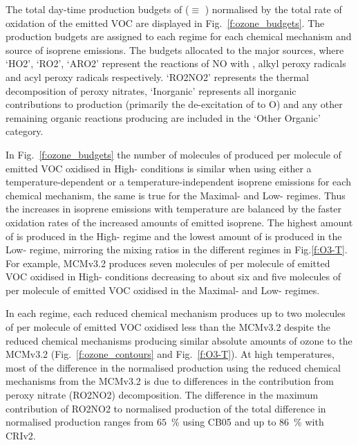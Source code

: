 The total day-time production budgets of  ($\equiv$ ) normalised by the total rate of oxidation of the emitted VOC are displayed in Fig.~\ref{f:ozone_budgets}.
The  production budgets are assigned to each  regime for each chemical mechanism and source of isoprene emissions.
The budgets allocated to the major sources, where `HO2', `RO2', `ARO2' represent the reactions of NO with , alkyl peroxy radicals and acyl peroxy radicals respectively.
`RO2NO2' represents the thermal decomposition of peroxy nitrates, `Inorganic' represents all inorganic contributions to  production (primarily the de-excitation of  to O) and any other remaining organic reactions producing  are included in the `Other Organic' category.

In Fig.~\ref{f:ozone_budgets} the number of molecules of  produced per molecule of emitted VOC oxidised in High- conditions is similar when using either a temperature-dependent or a temperature-independent isoprene emissions for each chemical mechanism, the same is true for the Maximal- and Low- regimes.
Thus the increases in isoprene emissions with temperature are balanced by the faster oxidation rates of the increased amounts of emitted isoprene.
The highest amount of  is produced in the High- regime and the lowest amount of  is produced in the Low- regime, mirroring the  mixing ratios in the different  regimes in Fig.\ref{f:O3-T}.
For example, MCMv3.2 produces seven molecules of  per molecule of emitted VOC oxidised in High- conditions decreasing to about six and five molecules of  per molecule of emitted VOC oxidised in the Maximal- and Low- regimes.

In each  regime, each reduced chemical mechanism produces up to two molecules of  per molecule of emitted VOC oxidised less than the MCMv3.2 despite the reduced chemical mechanisms producing similar absolute amounts of ozone to the MCMv3.2 (Fig.~\ref{f:ozone_contours} and Fig.~\ref{f:O3-T}).
At high temperatures, most of the difference in the normalised  production using the reduced chemical mechanisms from the MCMv3.2 is due to differences in the contribution from peroxy nitrate (RO2NO2) decomposition.
The difference in the maximum contribution of RO2NO2 to normalised  production of the total difference in normalised  production ranges from $65$~\% using CB05 and up to $86$~\%  with CRIv2.

